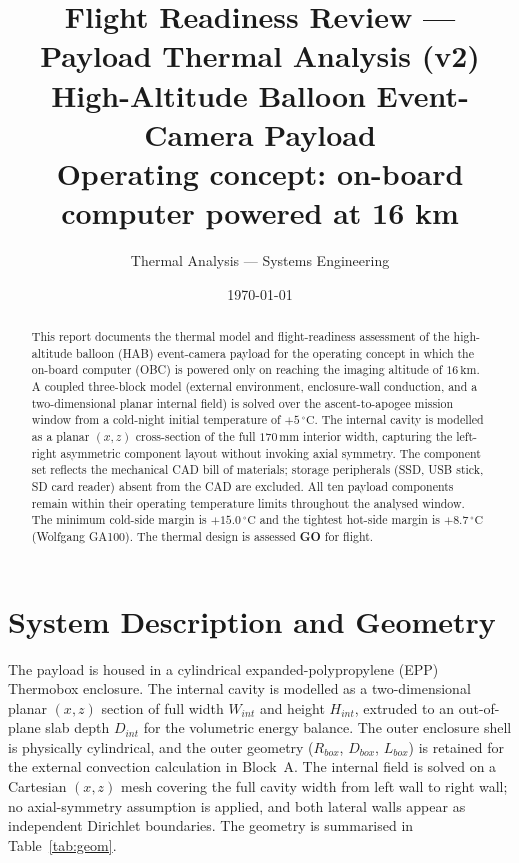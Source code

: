\documentclass[11pt,a4paper]{article}
\title{\textbf{Flight Readiness Review --- Payload Thermal Analysis (v2)}\\[2mm]
\large High-Altitude Balloon Event-Camera Payload\\[1mm]
\normalsize Operating concept: on-board computer powered at 16 km}
\author{Thermal Analysis --- Systems Engineering}
\date{\today}
\newcommand{\degC}{\,^{\circ}\mathrm{C}}
\newcommand{\unit}[1]{\,\mathrm{#1}}
\begin{document}
\maketitle

\begin{abstract}
\noindent This report documents the thermal model and flight-readiness assessment of
the high-altitude balloon (HAB) event-camera payload for the operating concept in which
the on-board computer (OBC) is powered only on reaching the imaging altitude of
$16\unit{km}$. A coupled three-block model (external environment, enclosure-wall
conduction, and a two-dimensional planar internal field) is solved over the
ascent-to-apogee mission window from a cold-night initial temperature of $+5\degC$.
The internal cavity is modelled as a planar $(x,z)$ cross-section of the full
$170\unit{mm}$ interior width, capturing the left-right asymmetric component layout
without invoking axial symmetry. The component set reflects the mechanical CAD bill
of materials; storage peripherals (SSD, USB stick, SD card reader) absent from the
CAD are excluded. All ten payload components remain within their operating temperature
limits throughout the analysed window. The minimum cold-side margin is $+15.0\degC$
and the tightest hot-side margin is $+8.7\degC$ (Wolfgang GA100). The thermal design
is assessed \textbf{GO} for flight.
\end{abstract}

\tableofcontents
\bigskip

\section{System Description and Geometry}
The payload is housed in a cylindrical expanded-polypropylene (EPP) Thermobox enclosure.
The internal cavity is modelled as a two-dimensional planar $(x,z)$ section of full
width $W_{int}$ and height $H_{int}$, extruded to an out-of-plane slab depth $D_{int}$
for the volumetric energy balance. The outer enclosure shell is physically cylindrical,
and the outer geometry ($R_{box}$, $D_{box}$, $L_{box}$) is retained for the external
convection calculation in Block~A. The internal field is solved on a Cartesian
$(x,z)$ mesh covering the full cavity width from left wall to right wall; no
axial-symmetry assumption is applied, and both lateral walls appear as independent
Dirichlet boundaries. The geometry is summarised in Table~\ref{tab:geom}.
\end{document}
